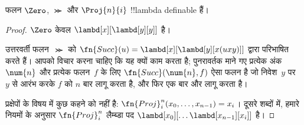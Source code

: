 \documentclass[../../../include/open-logic-section]{subfiles}
\begin{document}

\begin{lem}
फलन $\Zero$, $\Succ$ और $\Proj{n}{i}$ !!{lambda definable} हैं।
\end{lem}

\begin{proof}
$\Zero$ केवल $\lambd[x][\lambd[y][y]]$ है।

उत्तरवर्ती फलन~$\Succ$ को $\fn{Succ}(u) =
\lambd[x][\lambd[y][x(uxy)]]$ द्वारा परिभाषित करते हैं। आपको विचार करना
चाहिए कि यह क्यों काम करता है; पुनरावर्तक माने गए प्रत्येक अंक $\num{n}$
और प्रत्येक फलन~$f$ के लिए $\fn{Succ}(\num{n},f)$ ऐसा फलन है जो निवेश~$y$
पर~$y$ से आरंभ करके $f$ को $n$ बार लागू करता है, और फिर एक बार और लागू
करता है।

प्रक्षेपों के विषय में कुछ कहने को नहीं है: $\fn{Proj}^n_i(x_0, \dots,
x_{n-1}) = x_i$। दूसरे शब्दों में, हमारे नियमों के अनुसार $\fn{Proj}^n_i$
लैम्ब्डा पद $\lambd[x_0][\dots \lambd[x_{n-1}][x_i]]$ है।
\end{proof}
\end{document}
